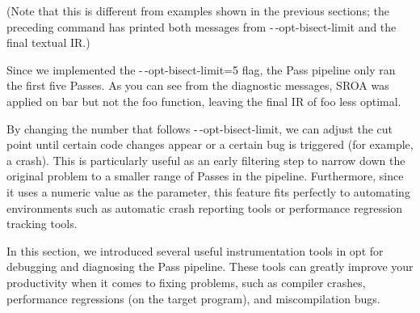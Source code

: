 (Note that this is different from examples shown in the previous sections; the preceding command has printed both messages from -\,-opt-bisect-limit and the final textual IR.)

Since we implemented the -\,-opt-bisect-limit=5 flag, the Pass pipeline only ran the first five Passes. As you can see from the diagnostic messages, SROA was applied on bar but not the foo function, leaving the final IR of foo less optimal.

By changing the number that follows -\,-opt-bisect-limit, we can adjust the cut point until certain code changes appear or a certain bug is triggered (for example, a crash). This is particularly useful as an early filtering step to narrow down the original problem to a smaller range of Passes in the pipeline. Furthermore, since it uses a numeric value as the parameter, this feature fits perfectly to automating environments such as automatic crash reporting tools or performance regression tracking tools.

In this section, we introduced several useful instrumentation tools in opt for debugging and diagnosing the Pass pipeline. These tools can greatly improve your productivity when it comes to fixing problems, such as compiler crashes, performance regressions (on the target program), and miscompilation bugs.































